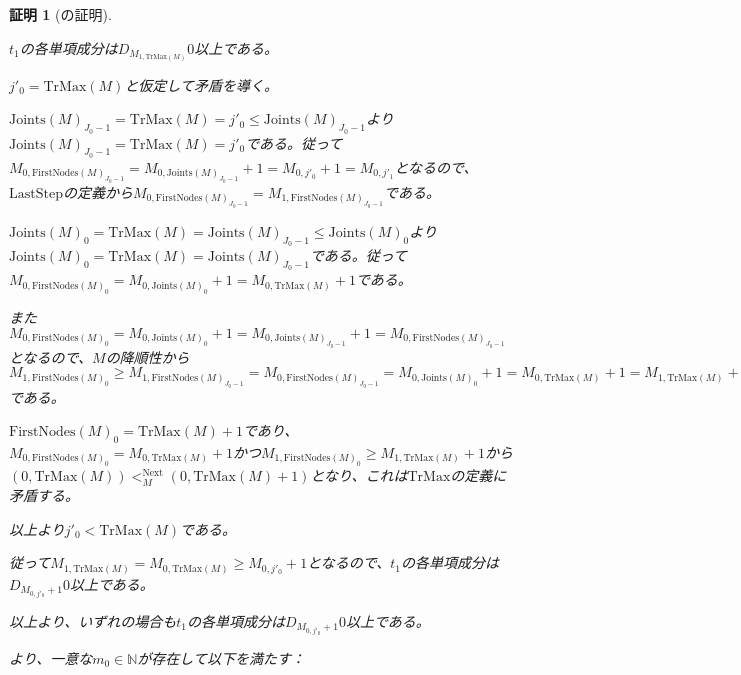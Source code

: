 \documentclass[dvipdfmx,uplatex]{jsarticle}
\theoremstyle{customnonumberbreakfortheorem}
\theoremstyle{customnonumberbreakforproof}
\newtheorem{hideableproof}{証明}
\begin{document}
\begin{hideableproof}[の証明]
\begin{indented}
\begin{penumerate}
			\begin{indented}
				\item \(t_1\)の各単項成分は\(D_{M_{1,\textrm{TrMax}(M)}} 0\)以上である。
				\item \(j'_0 = \textrm{TrMax}(M)\)と仮定して矛盾を導く。
				\begin{indented}
					\item \(\textrm{Joints}(M)_{J_0-1} = \textrm{TrMax}(M) = j'_0 \leq \textrm{Joints}(M)_{J_0-1}\)より\(\textrm{Joints}(M)_{J_0-1} = \textrm{TrMax}(M) = j'_0\)である。従って\(M_{0,\textrm{FirstNodes}(M)_{J_0-1}} = M_{0,\textrm{Joints}(M)_{J_0-1}}+1 = M_{0,j'_0}+1 = M_{0,j'_1}\)となるので、\(\textrm{LastStep}\)の定義から\(M_{0,\textrm{FirstNodes}(M)_{J_0-1}} = M_{1,\textrm{FirstNodes}(M)_{J_0-1}}\)である。
					\item \(\textrm{Joints}(M)_0 = \textrm{TrMax}(M) = \textrm{Joints}(M)_{J_0-1} \leq \textrm{Joints}(M)_0\)より\(\textrm{Joints}(M)_0 = \textrm{TrMax}(M) = \textrm{Joints}(M)_{J_0-1}\)である。従って\(M_{0,\textrm{FirstNodes}(M)_0} = M_{0,\textrm{Joints}(M)_0}+1 = M_{0,\textrm{TrMax}(M)}+1\)である。
					\item また\(M_{0,\textrm{FirstNodes}(M)_0} = M_{0,\textrm{Joints}(M)_0}+1 = M_{0,\textrm{Joints}(M)_{J_0-1}}+1 = M_{0,\textrm{FirstNodes}(M)_{J_0-1}}\)となるので、\(M\)の降順性から\(M_{1,\textrm{FirstNodes}(M)_0} \geq M_{1,\textrm{FirstNodes}(M)_{J_0-1}} = M_{0,\textrm{FirstNodes}(M)_{J_0-1}} = M_{0,\textrm{Joints}(M)_0}+1 = M_{0,\textrm{TrMax}(M)}+1 = M_{1,\textrm{TrMax}(M)}+1\)である。
					\item \(\textrm{FirstNodes}(M)_0 = \textrm{TrMax}(M)+1\)であり、\(M_{0,\textrm{FirstNodes}(M)_0} = M_{0,\textrm{TrMax}(M)}+1\)かつ\(M_{1,\textrm{FirstNodes}(M)_0} \geq M_{1,\textrm{TrMax}(M)}+1\)から\((0,\textrm{TrMax}(M)) <_M^{\textrm{Next}} (0,\textrm{TrMax}(M)+1) \)となり、これは\(\textrm{TrMax}\)の定義に矛盾する。
				\end{indented}
				\item 以上より\(j'_0 < \textrm{TrMax}(M)\)である。
				\item 従って\(M_{1,\textrm{TrMax}(M)} = M_{0,\textrm{TrMax}(M)} \geq M_{0,j'_0}+1\)となるので、\(t_1\)の各単項成分は\(D_{M_{0,j'_0}+1} 0\)以上である。
			\end{indented}
			\item[] 以上より、いずれの場合も\(t_1\)の各単項成分は\(D_{M_{0,j'_0}+1} 0\)以上である。
		\end{penumerate}
		\item
		\item {}より、一意な\(m_0 \in \mathbb{N}\)が存在して以下を満たす：

\end{indented}
\end{hideableproof}
\end{document}

